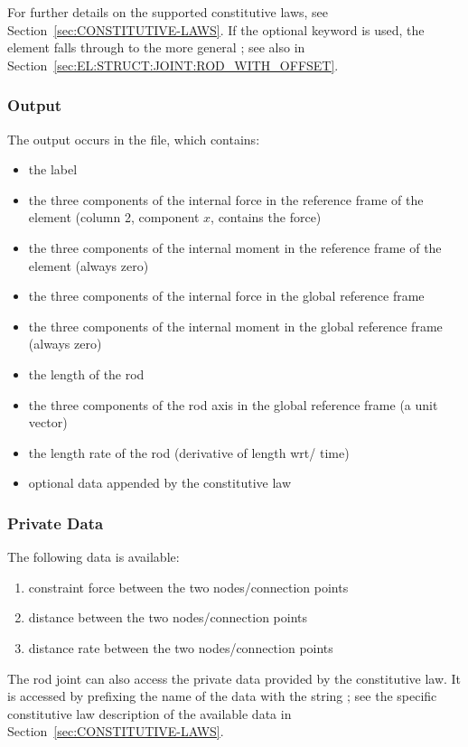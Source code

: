 For further details on the supported constitutive laws, 
see Section~\ref{sec:CONSTITUTIVE-LAWS}.
If the optional  keyword is used, the element falls through
to the more general ;
see also 
in Section~\ref{sec:EL:STRUCT:JOINT:ROD_WITH_OFFSET}.

\subsubsection{Output}
The output occurs in the  file, which contains:
\begin{itemize}
\item the label
\item the three components of the internal force in the reference frame
of the element (column 2, component $x$, contains the force)
\item the three components of the internal moment in the reference frame
of the element (always zero)
\item the three components of the internal force in the global
reference frame
\item the three components of the internal moment in the global
reference frame (always zero)
\item the length of the rod
\item the three components of the rod axis in the global reference frame
(a unit vector)
\item the length rate of the rod (derivative of length wrt/ time)
\item optional data appended by the constitutive law
\end{itemize}

\subsubsection{Private Data}
The following data is available:
\begin{enumerate}
\item {} constraint force between the two nodes/connection points
\item {} distance between the two nodes/connection points
\item {} distance rate between the two nodes/connection points
\end{enumerate}
The rod joint can also access the private data provided 
by the constitutive law.
It is accessed by prefixing the name of the data with the string
; see the specific constitutive law
description of the available data in Section~\ref{sec:CONSTITUTIVE-LAWS}.





